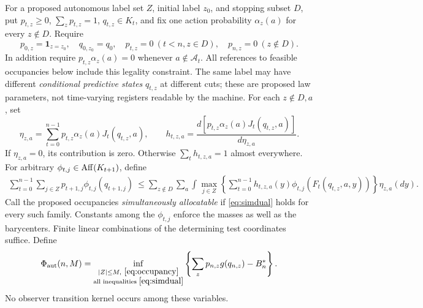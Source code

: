 For a proposed autonomous label set $Z$, initial label $z_0$, and stopping subset $D$, put
$p_{t,z}\ge0$, $\sum_zp_{t,z}=1$, $q_{t,z}\in K_t$, and fix one action probability $\alpha_z(a)$ for every $z\notin D$. Require
\begin{equation}\label{eq:occupancy}
 p_{0,z}=\mathbf1_{z=z_0},\quad q_{0,z_0}=q_0,\quad
 p_{t,z}=0\ (t<n,z\in D),\quad p_{n,z}=0\ (z\notin D).
\end{equation}
In addition require $p_{t,z}\alpha_z(a)=0$ whenever $a\notin\mathcal A_t$. All references to feasible occupancies below include this legality constraint. The same label may have different \emph{conditional predictive states} $q_{t,z}$ at different cuts; these are proposed law parameters, not time-varying registers readable by the machine. For each $z\notin D,a$, set
\begin{equation}\label{eq:domination}
 \eta_{z,a}=\sum_{t=0}^{n-1}p_{t,z}\alpha_z(a)J_t(q_{t,z},a),\qquad
 h_{t,z,a}=\frac{d[p_{t,z}\alpha_z(a)J_t(q_{t,z},a)]}{d\eta_{z,a}}.
\end{equation}
If $\eta_{z,a}=0$, its contribution is zero. Otherwise $\sum_t h_{t,z,a}=1$ almost everywhere. For arbitrary $\phi_{t,j}\in\operatorname{Aff}(K_{t+1})$, define
\begin{equation}\label{eq:simdual}
\begin{split}
 \sum_{t=0}^{n-1}\sum_{j\in Z}p_{t+1,j}\phi_{t,j}(q_{t+1,j})
 \ \le\sum_{z\notin D}\sum_a\int
 \max_{j\in Z}\left\{
  \sum_{t=0}^{n-1}h_{t,z,a}(y)\phi_{t,j}(F_t(q_{t,z},a,y))
 \right\}\eta_{z,a}(dy).
\end{split}
\end{equation}
Call the proposed occupancies \emph{simultaneously allocatable} if \eqref{eq:simdual} holds for every such family. Constants among the $\phi_{t,j}$ enforce the masses as well as the barycenters. Finite linear combinations of the determining test coordinates suffice. Define
\begin{equation}\label{eq:phiaut}
 \Phi_{\mathrm{aut}}(n,M)=\inf_{\substack{|Z|\le M,\ \eqref{eq:occupancy}\\
                    \text{all inequalities }\eqref{eq:simdual}}}
       \left\{\sum_zp_{n,z}g(q_{n,z})-B_n^*\right\}.
\end{equation}
No observer transition kernel occurs among these variables.

